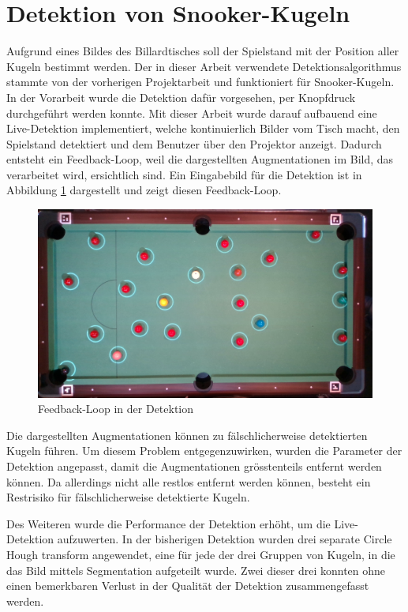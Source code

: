 \newpage
\section{Detektion von Snooker-Kugeln}\label{kap:detektion}
Aufgrund eines Bildes des Billardtisches soll der Spielstand mit der Position aller Kugeln bestimmt werden.
Der in dieser Arbeit verwendete Detektionsalgorithmus stammte von der vorherigen Projektarbeit\cite{project2:snooker_detection}
und funktioniert für Snooker-Kugeln.
In der Vorarbeit wurde die Detektion dafür vorgesehen, per Knopfdruck durchgeführt werden konnte.
Mit dieser Arbeit wurde darauf aufbauend eine Live-Detektion implementiert, welche kontinuierlich Bilder vom Tisch macht,
den Spielstand detektiert und dem Benutzer über den Projektor anzeigt.
Dadurch entsteht ein Feedback-Loop, weil die dargestellten Augmentationen im Bild, das verarbeitet wird, ersichtlich sind.
Ein Eingabebild für die Detektion ist in Abbildung \ref{fig:detection_feedback_loop} dargestellt und zeigt diesen Feedback-Loop.

\begin{figure}[h!]
    \begin{center}
        \includegraphics[width=0.8\linewidth]{../common/03_billiard_ai/resources/detection_feedback_loop.png}
    \end{center}
    \caption{Feedback-Loop in der Detektion}
    \label{fig:detection_feedback_loop}
\end{figure}

Die dargestellten Augmentationen können zu fälschlicherweise detektierten Kugeln führen.
Um diesem Problem entgegenzuwirken, wurden die Parameter der Detektion angepasst, damit die Augmentationen grösstenteils
entfernt werden können. Da allerdings nicht alle restlos entfernt werden können, besteht ein Restrisiko für
fälschlicherweise detektierte Kugeln.

Des Weiteren wurde die Performance der Detektion erhöht, um die Live-Detektion aufzuwerten.
In der bisherigen Detektion wurden drei separate Circle Hough transform\cite{wiki:circle_hough} angewendet, eine für
jede der drei Gruppen von Kugeln, in die das Bild mittels Segmentation aufgeteilt wurde\cite{project2:snooker_detection}.
Zwei dieser drei konnten ohne einen bemerkbaren Verlust in der Qualität der Detektion zusammengefasst werden.
